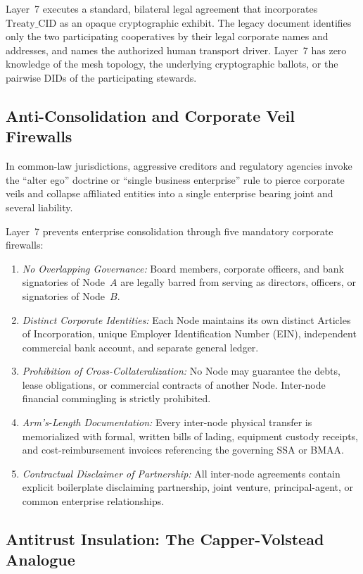 Layer~7 executes a standard, bilateral legal agreement that incorporates $\mathrm{Treaty\_CID}$ as an opaque cryptographic exhibit. The legacy document identifies only the two participating cooperatives by their legal corporate names and addresses, and names the authorized human transport driver. Layer~7 has zero knowledge of the mesh topology, the underlying cryptographic ballots, or the pairwise DIDs of the participating stewards.

\subsection{Anti-Consolidation and Corporate Veil Firewalls}

In common-law jurisdictions, aggressive creditors and regulatory agencies invoke the ``alter ego'' doctrine or ``single business enterprise'' rule to pierce corporate veils and collapse affiliated entities into a single enterprise bearing joint and several liability.

Layer~7 prevents enterprise consolidation through five mandatory corporate firewalls:
\begin{enumerate}
  \item \textit{No Overlapping Governance:} Board members, corporate officers, and bank signatories of Node~$A$ are legally barred from serving as directors, officers, or signatories of Node~$B$.
  \item \textit{Distinct Corporate Identities:} Each Node maintains its own distinct Articles of Incorporation, unique Employer Identification Number (EIN), independent commercial bank account, and separate general ledger.
  \item \textit{Prohibition of Cross-Collateralization:} No Node may guarantee the debts, lease obligations, or commercial contracts of another Node. Inter-node financial commingling is strictly prohibited.
  \item \textit{Arm's-Length Documentation:} Every inter-node physical transfer is memorialized with formal, written bills of lading, equipment custody receipts, and cost-reimbursement invoices referencing the governing SSA or BMAA.
  \item \textit{Contractual Disclaimer of Partnership:} All inter-node agreements contain explicit boilerplate disclaiming partnership, joint venture, principal-agent, or common enterprise relationships.
\end{enumerate}

\subsection{Antitrust Insulation: The Capper-Volstead Analogue}

